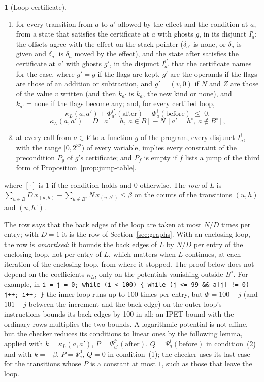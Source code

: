 \documentclass[oneside,english]{amsart}
\numberwithin{equation}{section}
\theoremstyle{plain}
\theoremstyle{definition}
\newtheorem{defn}[thm]{\protect\definitionname}
\theoremstyle{plain}
\theoremstyle{plain}
\theoremstyle{remark}
\providecommand{\definitionname}{Definition}
\begin{document}
\begin{defn}[Loop certificate]
\begin{enumerate}
  \item for every transition from $a$ to $a'$ allowed by the effect and the condition at $a$, from a state that satisfies the certificate at $a$ with ghosts $g$, in its disjunct $I_a^i$: the offsets agree with the effect on the stack pointer ($\delta_{a'}$ is none, or $\delta_a$ is given and $\delta_{a'}$ is $\delta_a$ moved by the effect), and the state after satisfies the certificate at $a'$ with ghosts $g'$, in the disjunct $I_{a'}^{i'}$ that the certificate names for the case, where $g' = g$ if the flags are kept, $g'$ are the operands if the flags are those of an addition or subtraction, and $g' = (v, 0)$ if $N$ and $Z$ are those of the value $v$ written (and then $k_{a'}$ is $k_a$, the new kind or none), and $k_{a'} = \mathrm{none}$ if the flags become any; and, for every certified loop,
  \[
    \kappa_L(a, a') + \Phi_{a'}^{i'}(\text{after}) - \Phi_a^{i}(\text{before}) \;\le\; 0,
  \]
  \[
    \kappa_L(a, a') = D\, [a' = h,\ a \in B] - N\, [a' = h^\circ,\ a \notin B^\circ],
  \]
  \item at every call from $a \in V$ to a function $g$ of the program, every disjunct $I_a^i$, with the range $[0, 2^{32})$ of every variable, implies every constraint of the precondition $P_g$ of $g$'s certificate; and $P_f$ is empty if $f$ lists a jump of the third form of Proposition~\ref{prop:jump-table}.
\end{enumerate}
where $[\cdot]$ is $1$ if the condition holds and $0$ otherwise. The \emph{row} of $L$ is $\sum_{u \in B} D\, x_{(u,h)} - \sum_{u \notin B^\circ} N\, x_{(u,h^\circ)} \le \beta$ on the counts of the transitions $(u, h)$ and $(u, h^\circ)$.
\end{defn}

The row says that the back edges of the loop are taken at most $N/D$ times per entry; with $D = 1$ it is the row of Section~\ref{sec:graphs}. With an enclosing loop, the row is \emph{amortised}: it bounds the back edges of $L$ by $N/D$ per entry of the enclosing loop, not per entry of $L$, which matters when $L$ continues, at each iteration of the enclosing loop, from where it stopped. The proof below does not depend on the coefficients $\kappa_L$, only on the potentials vanishing outside $B^\circ$. For example, in \texttt{i = j = 0; while (i < 100) \{ while (j <= 99 \&\& a[j] != 0) j++; i++; \}} the inner loop runs up to 100 times per entry, but $\Phi = 100 - j$ (and $101 - j$ between the increment and the back edge) on the outer loop's instructions bounds its back edges by 100 in all; an IPET bound with the ordinary rows multiplies the two bounds. A logarithmic potential is not affine, but the checker reduces its conditions to linear ones by the following lemma, applied with $k = \kappa_L(a, a')$, $P = \Psi_{a'}^{i'}(\text{after})$, $Q = \Psi_a^{i}(\text{before})$ in condition~(2) and with $k = -\beta$, $P = \Psi_e^0$, $Q = 0$ in condition~(1); the checker uses its last case for the transitions whose $P$ is a constant at most $1$, such as those that leave the loop.
\end{document}
